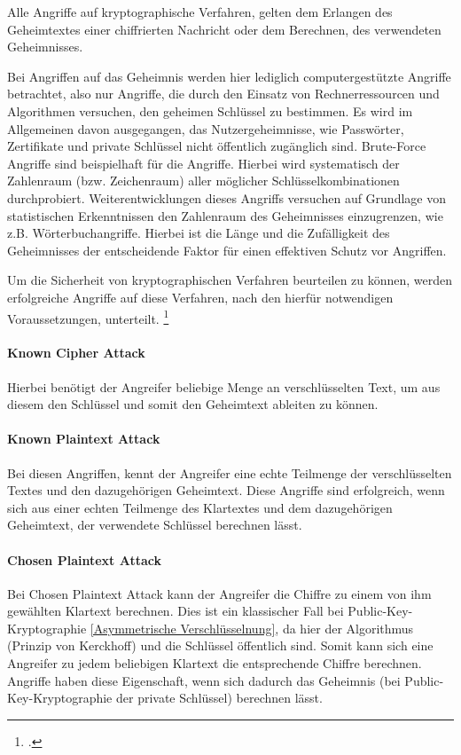         Alle Angriffe auf kryptographische Verfahren, gelten dem Erlangen des Geheimtextes einer chiffrierten Nachricht oder dem Berechnen, des verwendeten Geheimnisses.

        Bei Angriffen auf das Geheimnis werden hier lediglich computergestützte Angriffe betrachtet, also nur Angriffe, die durch den Einsatz von Rechnerressourcen und Algorithmen versuchen, den geheimen Schlüssel zu bestimmen. Es wird im Allgemeinen davon ausgegangen, das Nutzergeheimnisse, wie Passwörter, Zertifikate und private Schlüssel nicht öffentlich zugänglich sind.
        Brute-Force Angriffe sind beispielhaft für die Angriffe. Hierbei wird systematisch der Zahlenraum (bzw. Zeichenraum) aller möglicher Schlüsselkombinationen durchprobiert. Weiterentwicklungen dieses Angriffs versuchen auf Grundlage von statistischen Erkenntnissen den Zahlenraum des Geheimnisses einzugrenzen, wie z.B. Wörterbuchangriffe. Hierbei ist die Länge und die Zufälligkeit des Geheimnisses der entscheidende Faktor für einen effektiven Schutz vor Angriffen.
        
        Um die Sicherheit von kryptographischen Verfahren beurteilen zu können, werden erfolgreiche Angriffe auf diese Verfahren, nach den hierfür notwendigen Voraussetzungen, unterteilt. \footcite[20]{Beutelspacher.2015}
        \paragraph{Known Cipher Attack}
            Hierbei benötigt der Angreifer beliebige Menge an verschlüsselten Text, um aus diesem den Schlüssel und somit den Geheimtext ableiten zu können.
        \paragraph{Known Plaintext Attack}
            Bei diesen Angriffen, kennt der Angreifer eine echte Teilmenge der verschlüsselten Textes und den dazugehörigen Geheimtext. Diese Angriffe sind erfolgreich, wenn sich aus einer echten Teilmenge des Klartextes und dem dazugehörigen Geheimtext, der verwendete Schlüssel berechnen lässt.  
        \paragraph{Chosen Plaintext Attack}
            Bei Chosen Plaintext Attack kann der Angreifer die Chiffre zu einem von ihm gewählten Klartext berechnen. Dies ist ein klassischer Fall bei Public-Key-Kryptographie \ref{Asymmetrische Verschlüsselnung}, da hier der Algorithmus (Prinzip von Kerckhoff) und die Schlüssel öffentlich sind. Somit kann sich eine Angreifer zu jedem beliebigen Klartext die entsprechende Chiffre berechnen. Angriffe haben diese Eigenschaft, wenn sich dadurch das Geheimnis (bei Public-Key-Kryptographie der private Schlüssel) berechnen lässt.
        
